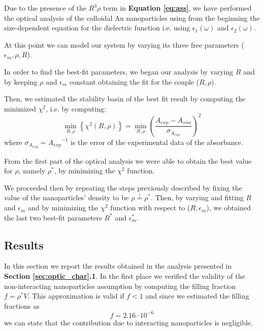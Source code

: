 \documentclass[twocolumn]{article}
\begin{document}
\begin{multicols}{2}

Due to the presence of the $R^3\rho$ term in \textbf{Equation \ref{eq:ass}}, we have performed the optical analysis of the colloidal Au nanoparticles using from the beginning the size-dependent equation for the dielectric function i.e. using $\epsilon_1(\omega)$ and $\epsilon_2(\omega)$.

At this point we can model our system by varying its three free parameters ($\epsilon_m, \rho, R$). 

In order to find the best-fit parameters, we began our analysis by varying $R$ and by keeping $\rho$ and $\epsilon_m$ constant obtaining the fit for the couple ($R,\rho$). 

Then, we estimated the stability basin of the best fit result by computing the minimized $\chi^2$, i.e. by computing:
\begin{equation}
        {\min}_{R,\rho} \left\{\chi^2 (R,\rho) \right\} =\min_{R,\rho} \left(\frac{A_{exp}-A_{sim}}{\sigma_{A_{exp}}}\right)^2 
\end{equation}
where $\sigma_{A_{exp}}={A_{exp}}^{-1}$ is the error of the experimental data of the absorbance.%

From the first part of the optical analysis we were able to obtain the best value for $\rho$, namely $\rho^*$, by minimizing the $\chi^2$ function.

We proceeded then by repeating the steps previously described by fixing the value of the nanoparticles' density to be $\rho\overset{!}{=}\rho^*$. Then, by varying and fitting $R$ and $\epsilon_m$ and by minimizing the $\chi^2$ function with respect to ($R,\epsilon_m$), we obtained the last two best-fit parameters $R^*$ and $\epsilon_m^*$.

\subsection{Results}
\label{sec:risultati}

In this section we report the results obtained in the analysis presented in \textbf{Section \ref{sec:optic_char}.1}.
In the first place we verified the validity of the non-interacting nanoparticles assumption by computing the filling fraction $f=\rho^* V$. This approximation is valid if $f<1$ and since we estimated the filling fractions as
\[f=2.16\cdot 10^{-6}\]
we can state that the contribution due to interacting nanoparticles is negligible.


\end{multicols}
\end{document}
